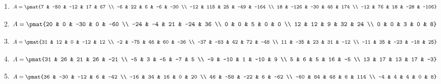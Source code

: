 \begin{enumerate}
\item

\begin{align*}
A = \pmat{7 & -50 & -12 & 17 & 67 \\ -6 & 22 & 6 & -6 & -30 \\ -12 & 115 & 25 & -49 & -164 \\ 18 & -126 & -30 & 46 & 174 \\ -12 & 76 & 18 & -28 & -106}
\end{align*}

\item

\begin{align*}
A = \pmat{20 & 0 & -30 & 0 & -60 \\ -24 & -4 & 21 & -24 & 36 \\ 0 & 0 & 5 & 0 & 0 \\ 12 & 12 & 9 & 32 & 24 \\ 0 & 0 & 3 & 0 & 8}
\end{align*}

\item

\begin{align*}
A = \pmat{31 & 12 & 0 & -12 & 12 \\ -2 & -75 & 46 & 60 & -36 \\ -37 & -83 & 42 & 72 & -48 \\ 11 & -35 & 23 & 31 & -12 \\ -11 & 35 & -23 & -18 & 25}
\end{align*}

\item

\begin{align*}
A = \pmat{31 & 26 & 21 & 26 & -21 \\ -5 & 3 & -5 & -7 & 5 \\ -9 & -10 & 1 & -10 & 9 \\ 5 & 6 & 5 & 16 & -5 \\ 13 & 17 & 13 & 17 & -3}
\end{align*}

\item

\begin{align*}
A = \pmat{36 & -30 & -12 & 6 & -42 \\ -16 & 34 & 16 & 0 & 20 \\ 46 & -58 & -22 & 6 & -62 \\ -60 & 84 & 48 & 6 & 114 \\ -4 & 4 & 4 & 0 & 8}
\end{align*}


\end{enumerate}
